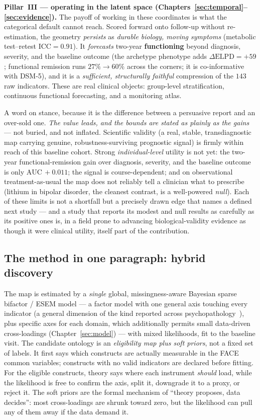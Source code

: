 \textbf{Pillar~III --- operating in the latent space (Chapters~\ref{sec:temporal}--\ref{sec:evidence}).} The
payoff of working in these coordinates is what the categorical default cannot reach. Scored forward onto
follow-up without re-estimation, the geometry \emph{persists} as \emph{durable biology, moving symptoms}
(metabolic test--retest $\text{ICC}=0.91$). It \emph{forecasts} two-year \textbf{functioning} beyond diagnosis,
severity, and the baseline outcome (the archetype phenotype adds $\Delta\text{ELPD}=+59$; functional remission
runs $27\%\!\to\!60\%$ across the corners; it is co-informative with DSM-5), and it is a \emph{sufficient,
structurally faithful} compression of the $143$ raw indicators. These are real clinical objects: group-level
stratification, continuous functional forecasting, and a monitoring atlas.

A word on stance, because it is the difference between a persuasive report and an over-sold one. \emph{The value
leads, and the bounds are stated as plainly as the gains} --- not buried, and not inflated. Scientific validity
(a real, stable, transdiagnostic map carrying genuine, robustness-surviving prognostic signal) is firmly within
reach of this baseline cohort. Strong \emph{individual-level} utility is not yet: the two-year
functional-remission gain over diagnosis, severity, and the baseline outcome is only $\mathrm{AUC}\,+0.011$; the
signal is course-dependent; and on observational treatment-as-usual the map does not reliably tell a clinician
what to prescribe (lithium in bipolar disorder, the cleanest contrast, is a well-powered \emph{null}). Each of
these limits is not a shortfall but a precisely drawn edge that names a defined next study --- and a study that
reports its modest and null results as carefully as its positive ones is, in a field prone to advancing
biological-validity evidence as though it were clinical utility, itself part of the contribution.

\subsection{The method in one paragraph: hybrid discovery}
The map is estimated by a \emph{single} global, missingness-aware Bayesian sparse bifactor / ESEM model ---
a factor model with one general axis touching every indicator (a general dimension of the kind reported across
psychopathology~\cite{caspi2014pfactor}), plus specific axes for each domain, which
additionally permits small data-driven cross-loadings (Chapter~\ref{sec:model}) --- with mixed likelihoods,
fit to the baseline visit. The candidate ontology is an \emph{eligibility map plus soft priors}, not a fixed
set of labels. It first says which constructs are actually measurable in the FACE common variables; constructs
with no valid indicators are declared  before fitting. For the eligible constructs, theory
says where each instrument \emph{should} load, while the likelihood is free to confirm the axis, split it,
downgrade it to a proxy, or reject it. The soft priors are the formal mechanism of ``theory proposes, data
decides'': most cross-loadings are shrunk toward zero, but the likelihood can pull any of them away if the data
demand it.

